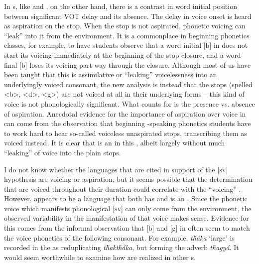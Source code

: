 \documentclass[output=paper]{LSP/langsci}
\begin{document}
In s, like  and , on the other hand, there is a contrast in word initial position between significant VOT delay and its absence. The delay in voice onset is heard as aspiration on the stop. When the stop is not aspirated, phonetic voicing can ``leak'' into it from the environment. It is a commonplace in beginning phonetics classes, for example, to have students observe that a word initial [b] in  does not start its voicing immediately at the beginning of the stop closure, and a word-final [b] loses its voicing part way through the closure. Although most of us have been taught that this is assimilative or ``leaking'' voicelessness into an underlyingly voiced consonant, the new analysis is instead that the stops (spelled <b>, <d>, <g>) are not voiced at all in their underlying forms -- this kind of voice is not phonologically significant. What counts for  is the presence vs. absence of aspiration. Anecdotal evidence for the importance of aspiration over voice in  can come from the observation that beginning -speaking phonetics students have to work hard to hear so-called voiceless unaspirated stops, transcribing them as voiced instead. It is clear that  is an  in this , albeit largely without much ``leaking'' of voice into the plain stops.

I do not know whether the languages that are cited in support of the [\textsc{sv}] hypothesis are voicing or aspiration, but it seems possible that the determination that  are voiced throughout their duration could correlate with the ``voicing'' . However,  appears to be a language that both has  and is an . Since the phonetic voice which manifests phonological [\textsc{sv}] can only come from the environment, the observed variability in the manifestation of that voice makes sense. Evidence for this comes from the informal observation that [b] and [g] in  often seem to match the voice phonetics of the following consonant. For example, \textit{t\v{h}áka} `large' is recorded in the  as reduplicating \textit{t\v{h}akt\v{h}áka}, but forming the adverb \textit{t\v{h}agyá}. It would seem worthwhile to examine how  are realized in other s.
\end{document}
